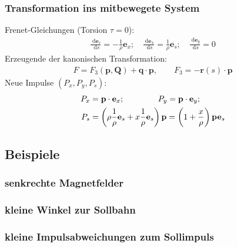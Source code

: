 \documentclass[hyperref={pdfpagelabels=false}]{beamer}
\newcommand {\dx} {\; \mathrm{d} }              %
\begin{document}
\begin{frame}
 \frametitle{Transformation ins mitbewegete System}
 \pause
 Frenet-Gleichungen (Torsion $\tau=0$):
 \begin{align*}
  \frac{\dx \mathbf{e}_s}{\dx s} = -\frac{1}{\rho}\mathbf{e}_x;\quad\frac{\dx \mathbf{e}_x}{\dx s} = \frac{1}{\rho}\mathbf{e}_s;\quad\frac{\dx \mathbf{e}_y}{\dx s} = 0
 \end{align*}
 Erzeugende der kanonischen Transformation:
 \begin{align*}
  F = F_3(\mathbf{p},\mathbf{Q}) + \mathbf{q}\cdot\mathbf{p}, \qquad F_3 = -\mathbf{r}(s)\cdot\mathbf{p}
 \end{align*}
 Neue Impulse $(P_x, P_y,P_s)$:
 \begin{align*}
  P_x &= \mathbf{p}\cdot\mathbf{e}_x; \hspace{1.45cm} P_y = \mathbf{p}\cdot\mathbf{e}_y;\\
  P_s &= \left(\rho\frac{1}{\rho}\mathbf{e}_s+x\frac{1}{\rho}\mathbf{e}_s\right)\mathbf{p} = \left(1+\frac{x}{\rho}\right)\mathbf{p}\mathbf{e}_s
 \end{align*}



\end{frame}


\subsection{Beispiele}
\begin{frame}
\frametitle{senkrechte Magnetfelder}
 \pause
 \begin{itemize}
 \end{itemize}
\end{frame}

\begin{frame}
 \frametitle{kleine Winkel zur Sollbahn}
\end{frame}

\begin{frame}
 \frametitle{kleine Impulsabweichungen zum Sollimpuls}
\end{frame}
\end{document}
